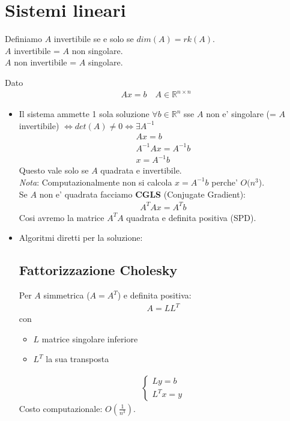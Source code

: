\documentclass[a4paper,12pt]{article}
\begin{document}
\section{Sistemi lineari}
\begin{tcolorbox}[colback=blue!5!white, colframe=blue!75!black]
Definiamo $A$ invertibile se e solo se $dim(A)=rk(A)$. \\
$A$ invertibile = $A$ non singolare. \\
$A$ non invertibile = $A$ singolare.
\end{tcolorbox}
Dato 
\begin{align*}
    Ax = b \quad A \in \mathbb{R}^{n \times n}
\end{align*}
\begin{itemize}
    \item Il sistema ammette 1 sola soluzione $\forall b \in \mathbb{R}^n$ sse $A$ non e' singolare (= $A$ invertibile) $\iff det(A) \neq 0 \iff \exists A^{-1}$
    \begin{align*}
        Ax=b \\
        A^{-1}Ax = A^{-1} b \\
        \boxed{x = A^{-1} b}
    \end{align*}
    Questo vale solo se $A$ quadrata e invertibile. \\
    \textit{Nota}: Computazionalmente non si calcola $x=A^{-1}b$ perche' $O(n^3$). \\
    Se $A$ non e' quadrata facciamo \textbf{CGLS} (Conjugate Gradient)\label{sec:cgls}:
    \begin{align*}
        A^T A x = A^T b 
    \end{align*}
    Cosi avremo la matrice $A^T A$ quadrata e definita positiva (SPD).
    \item Algoritmi diretti per la soluzione: 
    \subsection{Fattorizzazione Cholesky}
    Per $A$ simmetrica ($A=A^T$) e definita positiva:
    \begin{align*}
        A=LL^T
    \end{align*}
    con 
    \begin{itemize}
        \item $L$ matrice singolare inferiore
        \item $L^T$ la sua transposta
    \end{itemize}
    \begin{align*}
        \begin{cases}
            Ly = b \\
            L^Tx=y
        \end{cases}    
    \end{align*}
    Costo computazionale: $O(\frac{1}{n^3})$. 

\end{itemize}
\end{document}
